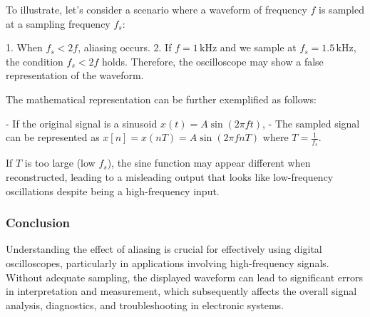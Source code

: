 To illustrate, let's consider a scenario where a waveform of frequency \( f \) is sampled at a sampling frequency \( f_s \):

1. When \( f_s < 2f \), aliasing occurs.
2. If \( f = 1 \, \text{kHz} \) and we sample at \( f_s = 1.5 \, \text{kHz} \), the condition \( f_s < 2f \) holds. Therefore, the oscilloscope may show a false representation of the waveform.

The mathematical representation can be further exemplified as follows:

- If the original signal is a sinusoid \( x(t) = A \sin(2\pi f t) \),
- The sampled signal can be represented as \( x[n] = x(nT) = A \sin(2\pi f nT) \) where \( T = \frac{1}{f_s} \).

If \( T \) is too large (low \( f_s \)), the sine function may appear different when reconstructed, leading to a misleading output that looks like low-frequency oscillations despite being a high-frequency input.

\subsubsection{Conclusion}
Understanding the effect of aliasing is crucial for effectively using digital oscilloscopes, particularly in applications involving high-frequency signals. Without adequate sampling, the displayed waveform can lead to significant errors in interpretation and measurement, which subsequently affects the overall signal analysis, diagnostics, and troubleshooting in electronic systems.

